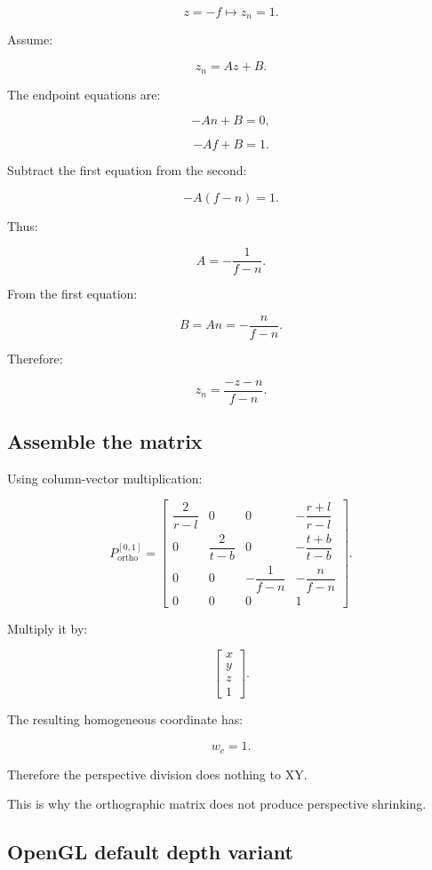 \[
 z=-f\longmapsto z_n=1.
\]

Assume:

\[
 z_n=Az+B.
\]

The endpoint equations are:

\[
 -An+B=0,
\]

\[
 -Af+B=1.
\]

Subtract the first equation from the second:

\[
 -A(f-n)=1.
\]

Thus:

\[
 \boxed{ A=-\frac1{f-n} }.
\]

From the first equation:

\[
 B=An=-\frac n{f-n}.
\]

Therefore:

\[
 \boxed{ z_n=\frac{-z-n}{f-n} }.
\]

\subsection{Assemble the matrix}\label{02-foundations-ii-ch033-assemble-the-matrix}

\hypertarget{02-foundations-ii-ch033-assemble-the-matrix}{}

Using column-vector multiplication:

\[
 \boxed{ P_{\mathrm{ortho}}^{[0,1]}= \begin{bmatrix} \dfrac2{r-l}&0&0&-\dfrac{r+l}{r-l}\\ 0&\dfrac2{t-b}&0&-\dfrac{t+b}{t-b}\\ 0&0&-\dfrac1{f-n}&-\dfrac n{f-n}\\ 0&0&0&1 \end{bmatrix} }.
\]

Multiply it by:

\[
 \begin{bmatrix}x\\y\\z\\1\end{bmatrix}.
\]

The resulting homogeneous coordinate has:

\[
 w_c=1.
\]

Therefore the perspective division does nothing to XY.

This is why the orthographic matrix does not produce perspective shrinking.

\subsection{OpenGL default depth variant}\label{02-foundations-ii-ch033-opengl-default-depth-variant}

